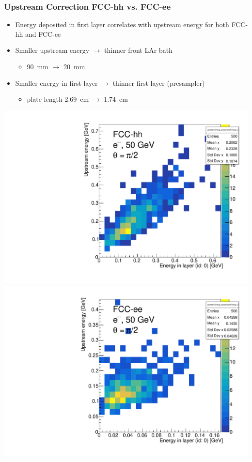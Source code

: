 \documentclass{beamer}
\begin{document}
\begin{frame}
  \frametitle{Upstream Correction FCC-hh vs. FCC-ee}

  \begin{itemize}
    \item Energy deposited in first layer correlates with upstream energy for
          both FCC-hh and FCC-ee
    \item Smaller upstream energy $\rightarrow$ thinner front LAr bath
          \begin{itemize}
            \item 90~mm $\rightarrow$ 20~mm
          \end{itemize}
    \item Smaller energy in first layer $\rightarrow$ thinner first layer
          (presampler)
          \begin{itemize}
            \item plate length 2.69~cm $\rightarrow$ 1.74~cm
          \end{itemize}
  \end{itemize}

  \includegraphics[width=0.49\linewidth]{figures/fcchh_hist_upstream_vs_first_layer_90deg_50GeV.pdf}
  \includegraphics[width=0.49\linewidth]{figures/fccee_hist_upstream_vs_first_layer_90deg_50GeV.pdf}
\end{frame}
\end{document}

